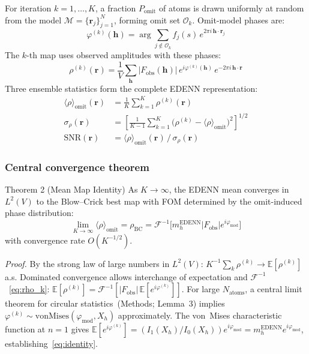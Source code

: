 \documentclass[10pt,twocolumn]{article}
\newcommand{\Fobs}{F_{\!\mathrm{obs}}}
\newcommand{\phimod}{\varphi_{\mathrm{mod}}}
\newcommand{\mh}{m_h}
\newcommand{\Xh}{X_h}
\newcommand{\rhoBC}{\rho_{\mathrm{BC}}}
\newcommand{\rhoens}{\langle\rho\rangle_{\mathrm{omit}}}
\newcommand{\IFT}{\mathcal{F}^{-1}}
\newcommand{\Eop}{\mathbb{E}}
\newcommand{\SNR}{\mathrm{SNR}}
\newcommand{\boldh}{\mathbf{h}}
\newcommand{\boldr}{\mathbf{r}}
\begin{document}
For iteration $k = 1,\ldots,K$, a fraction $P_{\mathrm{omit}}$ of
atoms is drawn uniformly at random from the model
$\mathcal{M}=\{\boldr_j\}_{j=1}^N$, forming omit set
$\mathcal{O}_k$.  Omit-model phases are:
\begin{equation}
  \varphi^{(k)}(\boldh) = \arg\!\!\sum_{j\notin\mathcal{O}_k}
    f_j(s)\,e^{2\pi i\,\boldh\cdot\boldr_j}
  \label{eq:omit_phase}
\end{equation}
The $k$-th map uses observed amplitudes with these phases:
\begin{equation}
  \rho^{(k)}(\boldr)
  = \frac{1}{V}\sum_{\boldh}
    |\Fobs(\boldh)|\,e^{i\varphi^{(k)}(\boldh)}\,
    e^{-2\pi i\,\boldh\cdot\boldr}
  \label{eq:rho_k}
\end{equation}
Three ensemble statistics form the complete EDENN representation:
\begin{align}
  \rhoens(\boldr)
  &= \frac{1}{K}\sum_{k=1}^K \rho^{(k)}(\boldr)
  \tag{EDENN-mean}\label{eq:mean}\\[2pt]
  \sigma_\rho(\boldr)
  &= \!\left[\frac{1}{K-1}\sum_{k=1}^K
    \bigl(\rho^{(k)}-\rhoens\bigr)^2\right]^{\!\!1/2}
  \tag{EDENN-std}\label{eq:std}\\[2pt]
  \SNR(\boldr)
  &= \rhoens(\boldr)\,/\,\sigma_\rho(\boldr)
  \tag{EDENN-SNR}\label{eq:snr}
\end{align}

\subsubsection{Central convergence theorem}

\begin{mathbox}{Theorem 2 (Mean Map Identity)}
As $K\to\infty$, the EDENN mean converges in $L^2(V)$ to the
Blow--Crick best map with FOM determined by the omit-induced
phase distribution:
\begin{equation}
  \lim_{K\to\infty}\rhoens = \rhoBC
  = \IFT\!\bigl[\mh^{\mathrm{EDENN}}|\Fobs|e^{i\phimod}\bigr]
  \label{eq:identity}
\end{equation}
with convergence rate $O(K^{-1/2})$.
\end{mathbox}

\noindent\textit{Proof.}
By the strong law of large numbers in $L^2(V)$:
$K^{-1}\sum_k\rho^{(k)}\to\Eop[\rho^{(k)}]$ a.s.
Dominated convergence allows interchange of expectation and
$\IFT$~\eqref{eq:rho_k}:
$\Eop[\rho^{(k)}] = \IFT[|\Fobs|\,\Eop[e^{i\varphi^{(k)}}]]$.
For large $N_{\mathrm{atoms}}$, a central limit theorem for
circular statistics~(Methods; Lemma~3) implies
$\varphi^{(k)}\sim\mathrm{vonMises}(\phimod,\Xh)$ approximately.
The von~Mises characteristic function at $n=1$ gives
$\Eop[e^{i\varphi^{(k)}}] = (I_1(\Xh)/I_0(\Xh))e^{i\phimod}
= \mh^{\mathrm{EDENN}}e^{i\phimod}$,
establishing~\eqref{eq:identity}.
\end{document}
